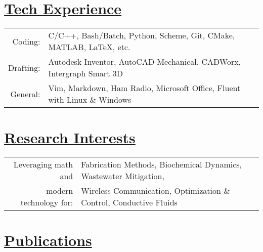 \documentclass[10pt]{article}   %
\begin{document}
\section*{\underline{Tech Experience}}
\begin{tabular}{ r | l }
Coding:          &C/C++, Bash/Batch, Python, Scheme, Git, CMake, MATLAB, \LaTeX, etc.\\
Drafting:        &Autodesk Inventor, AutoCAD Mechanical, CADWorx, Intergraph Smart 3D\\
General:        &Vim, Markdown, Ham Radio, Microsoft Office, Fluent with Linux \& Windows
\end{tabular}

\section*{\underline{Research Interests}}
\begin{tabular}{r | l}
Leveraging math and             & Fabrication Methods, Biochemical Dynamics, Wastewater Mitigation,\\
modern technology for:          &Wireless Communication, Optimization \& Control, Conductive Fluids\\
\end{tabular}

\section*{\underline{Publications}}
\\
\\

\end{document}

